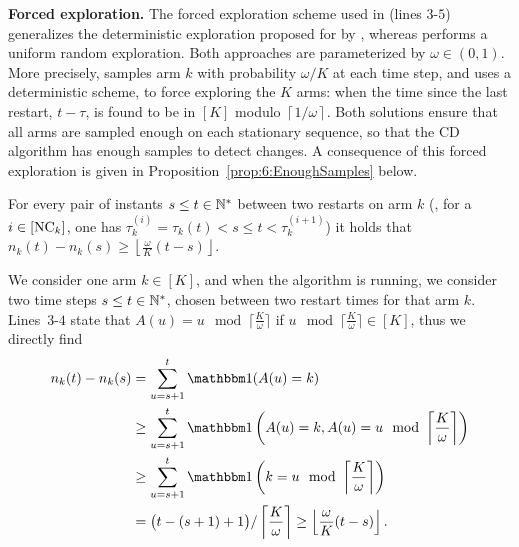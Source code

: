 \textbf{Forced exploration.}
%
The forced exploration scheme used in \GLRklUCB{} (lines $3$-$5$) generalizes the deterministic exploration proposed for \MUCB{} by \cite{CaoZhenKvetonXie18}, whereas \CUSUMUCB{} performs a uniform random exploration.
Both approaches are parameterized by $\omega\in(0,1)$.
More precisely, \CUSUMUCB{} samples arm $k$ with probability $\omega/K$ at each time step,
and \MUCB{} uses a deterministic scheme, to force exploring the $K$ arms: when the time since the last restart, $t - \tau$, is found to be in $[K]$ modulo $\left\lceil 1/\omega \right\rceil$.
Both solutions ensure that all arms are sampled enough on each stationary sequence, so that the CD algorithm has enough \iid{} samples to detect changes.
%
A consequence of this forced exploration is given in Proposition~\ref{prop:6:EnoughSamples} below.

\begin{proposition}\label{prop:6:EnoughSamples}
\begin{leftbar}[propositionbar]  %
    For every pair of instants $s \leq t\in\mathbb{N}^*$ between two restarts on arm $k$ (\ie, for a $i\in[\text{NC}_k]$, one has $\tau_k^{(i)} = \tau_k(t) < s \leq t < \tau_k^{(i+1)}$) it holds that
    $n_k(t) - n_k(s) \geq \left\lfloor \frac{\omega}{K} (t-s) \right\rfloor$.
\end{leftbar}  %
\end{proposition}

\begin{smallproof}
    We consider one arm $k\in[K]$, and when the \GLRklUCB{} algorithm is running,
    we consider two time steps $s\leq t\in\mathbb{N}^*$, chosen between two restart times for that arm $k$.
    Lines~$3$-$4$ state that $A(u) = u \mod \lceil \frac{K}{\omega} \rceil$
    if $u \mod \lceil \frac{K}{\omega} \rceil \in [K]$,
    thus we directly find
    \begin{align*}
        n_k(t) - n_k(s)
        & = \sum_{u=s+1}^{t} \indic(A(u) = k) \\
        & \geq \sum_{u=s+1}^{t} \indic\left(A(u) = k, A(u) = u \mod \left\lceil \frac{K}{\omega} \right\rceil\right) \\
        & \geq \sum_{u=s+1}^{t} \indic\left(k = u \mod \left\lceil \frac{K}{\omega} \right\rceil\right) \\
        & = \bigl(t - (s+1) + 1\bigr) / \left\lceil \frac{K}{\omega} \right\rceil
        \geq \left\lfloor \frac{\omega}{K} (t - s) \right\rfloor.
    \end{align*}
\end{smallproof}


